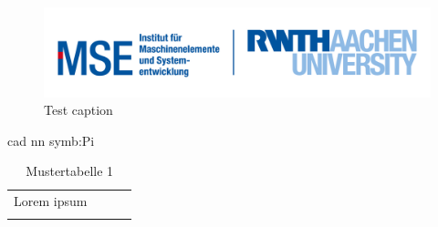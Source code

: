 \lipsum \citep{duerer}
\lipsum

\begin{figure}[h]
    \centering
    \includegraphics[width=\textwidth]{images/logo1.png}
    \caption{Test caption \citep{sutherland}}
\end{figure}

\lipsum \gls{cad} \gls{nn} \gls{symb:Pi}

\begin{table}[ht!]
    \caption{Mustertabelle 1}
    \label{test_label}
    \centering
    \begin{tabular}{|p{}|p{}|p{}|p{}|}
    \hline
     &  &  &\\
    \hline
    Lorem ipsum &  &  &\\
    \hline
     &  &  & \\
    \hline
    \end{tabular}
\end{table}
